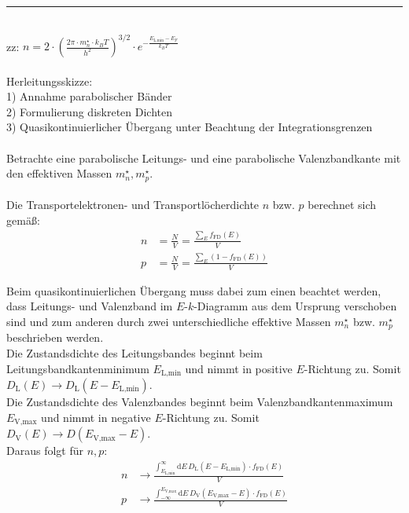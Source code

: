 \documentclass{article}
\newcommand{\diff}{\mathrm{d}}
\newcommand{\lr}[1]{\left(#1\right)}
\begin{document}
{\color{violet}
\hrule
	\\
	zz: $n = 2 \cdot \lr{ \frac{2\pi \cdot m_n^\star \cdot k_BT}{h^2} }^{3/2} \cdot e^{-\frac{E_\text{L,min}-E_F}{k_B T}}$\\
	\\
	Herleitungsskizze:\\
	1) Annahme parabolischer Bänder \\
	2) Formulierung diskreten Dichten \\
	3) Quasikontinuierlicher Übergang unter Beachtung der Integrationsgrenzen \\
	\\
	Betrachte eine parabolische Leitungs- und eine parabolische Valenzbandkante mit den effektiven Massen $m_n^\star, m_p^\star$.\\
	\\
	Die Transportelektronen- und Transportlöcherdichte  $n$ bzw. $p$ berechnet sich gemäß:
		\begin{align*}
			n &= \frac{N}{V} = \frac{\sum_E f_\text{FD}(E)}{V} \\
			p &= \frac{N}{V} = \frac{\sum_E (1 - f_\text{FD}(E))}{V}
		\end{align*}

	Beim quasikontinuierlichen Übergang muss dabei zum einen beachtet werden, dass Leitungs- und Valenzband im $E$-$k$-Diagramm aus dem Ursprung verschoben sind und zum anderen durch zwei unterschiedliche effektive Massen $m_n^\star$ bzw. $m_p^\star$ beschrieben werden.\\
	Die Zustandsdichte des Leitungsbandes beginnt beim Leitungsbandkantenminimum $E_\text{L,min}$ und nimmt in positive $E$-Richtung zu. Somit $D_\text{L}(E) \to D_\text{L}(E-E_\text{L,min})$.\\
	Die Zustandsdichte des Valenzbandes beginnt beim Valenzbandkantenmaximum $E_\text{V,max}$ und nimmt in negative $E$-Richtung zu. Somit $D_\text{V}(E) \to D(E_\text{V,max}-E)$.\\
	Daraus folgt für $n,p$:
		\begin{align*}
			n &\longrightarrow \frac{\int_{E_\text{L,min}}^\infty \diff E \, D_\text{L}(E-E_\text{L,min}) \cdot f_\text{FD}(E)}{V} \\
			p &\longrightarrow \frac{\int^{E_\text{V,max}}_{-\infty} \diff E \, D_\text{V}(E_\text{V,max}-E) \cdot f_\text{FD}(E)}{V}
		\end{align*}

}
\end{document}
